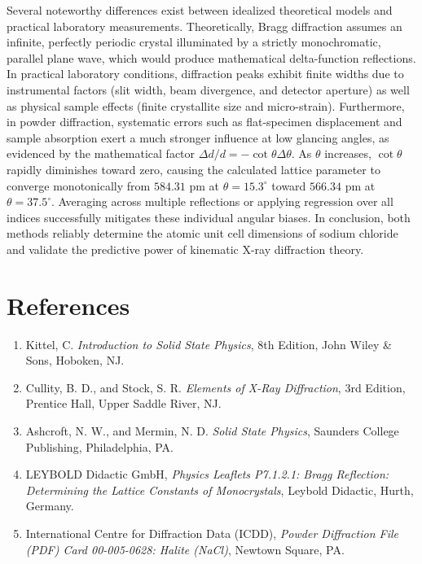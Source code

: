 \documentclass[12pt,a4paper]{article}
\begin{document}
Several noteworthy differences exist between idealized theoretical models and practical laboratory measurements. Theoretically, Bragg diffraction assumes an infinite, perfectly periodic crystal illuminated by a strictly monochromatic, parallel plane wave, which would produce mathematical delta-function reflections. In practical laboratory conditions, diffraction peaks exhibit finite widths due to instrumental factors (slit width, beam divergence, and detector aperture) as well as physical sample effects (finite crystallite size and micro-strain). Furthermore, in powder diffraction, systematic errors such as flat-specimen displacement and sample absorption exert a much stronger influence at low glancing angles, as evidenced by the mathematical factor $\Delta d / d = -\cot\theta \Delta\theta$. As $\theta$ increases, $\cot\theta$ rapidly diminishes toward zero, causing the calculated lattice parameter to converge monotonically from $584.31\text{ pm}$ at $\theta = 15.3^\circ$ toward $566.34\text{ pm}$ at $\theta = 37.5^\circ$. Averaging across multiple reflections or applying regression over all indices successfully mitigates these individual angular biases. In conclusion, both methods reliably determine the atomic unit cell dimensions of sodium chloride and validate the predictive power of kinematic X-ray diffraction theory.

\newpage

\section{References}
\begin{enumerate}
    \item Kittel, C. \textit{Introduction to Solid State Physics}, 8th Edition, John Wiley \& Sons, Hoboken, NJ.
    \item Cullity, B. D., and Stock, S. R. \textit{Elements of X-Ray Diffraction}, 3rd Edition, Prentice Hall, Upper Saddle River, NJ.
    \item Ashcroft, N. W., and Mermin, N. D. \textit{Solid State Physics}, Saunders College Publishing, Philadelphia, PA.
    \item LEYBOLD Didactic GmbH, \textit{Physics Leaflets P7.1.2.1: Bragg Reflection: Determining the Lattice Constants of Monocrystals}, Leybold Didactic, Hurth, Germany.
    \item International Centre for Diffraction Data (ICDD), \textit{Powder Diffraction File (PDF) Card 00-005-0628: Halite (NaCl)}, Newtown Square, PA.
\end{enumerate}
\end{document}
